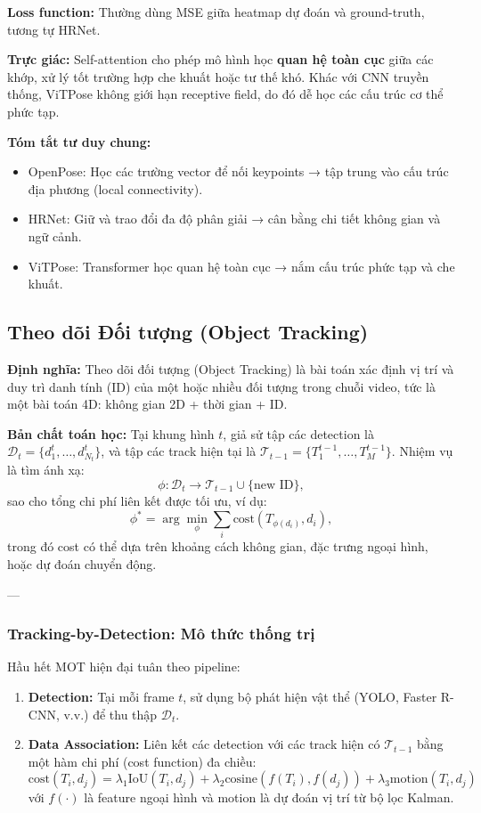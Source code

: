 \textbf{Loss function:} Thường dùng MSE giữa heatmap dự đoán và ground-truth, tương tự HRNet.

\textbf{Trực giác:} Self-attention cho phép mô hình học \textbf{quan hệ toàn cục} giữa các khớp, xử lý tốt trường hợp che khuất hoặc tư thế khó. Khác với CNN truyền thống, ViTPose không giới hạn receptive field, do đó dễ học các cấu trúc cơ thể phức tạp.

\textbf{Tóm tắt tư duy chung:}
\begin{itemize}
	\item OpenPose: Học các trường vector để nối keypoints → tập trung vào cấu trúc địa phương (local connectivity).
	\item HRNet: Giữ và trao đổi đa độ phân giải → cân bằng chi tiết không gian và ngữ cảnh.
	\item ViTPose: Transformer học quan hệ toàn cục → nắm cấu trúc phức tạp và che khuất.
\end{itemize}

\subsection{Theo dõi Đối tượng (Object Tracking)}
\label{subsec:object_tracking}

\textbf{Định nghĩa:} Theo dõi đối tượng (Object Tracking) là bài toán xác định vị trí và duy trì danh tính (ID) của một hoặc nhiều đối tượng trong chuỗi video, tức là một bài toán 4D: không gian 2D + thời gian + ID.  

\textbf{Bản chất toán học:}  
Tại khung hình $t$, giả sử tập các detection là $\mathcal{D}_t = \{d_1^t, \dots, d_{N_t}^t\}$, và tập các track hiện tại là $\mathcal{T}_{t-1} = \{T_1^{t-1}, \dots, T_M^{t-1}\}$. Nhiệm vụ là tìm ánh xạ:
\[
\phi: \mathcal{D}_t \rightarrow \mathcal{T}_{t-1} \cup \{\text{new ID}\},
\]
sao cho tổng chi phí liên kết được tối ưu, ví dụ:
\[
\phi^* = \arg \min_\phi \sum_{i} \text{cost}(T_{\phi(d_i)}, d_i),
\]
trong đó cost có thể dựa trên khoảng cách không gian, đặc trưng ngoại hình, hoặc dự đoán chuyển động.

---

\subsubsection{Tracking-by-Detection: Mô thức thống trị}
\label{subsubsec:tracking_by_detection}

Hầu hết MOT hiện đại tuân theo pipeline:
\begin{enumerate}
	\item \textbf{Detection:} Tại mỗi frame $t$, sử dụng bộ phát hiện vật thể (YOLO, Faster R-CNN, v.v.) để thu thập $\mathcal{D}_t$.
	\item \textbf{Data Association:} Liên kết các detection với các track hiện có $\mathcal{T}_{t-1}$ bằng một hàm chi phí (cost function) đa chiều:
	\[
	\text{cost}(T_i, d_j) = \lambda_1 \text{IoU}(T_i, d_j) + \lambda_2 \text{cosine}(f(T_i), f(d_j)) + \lambda_3 \text{motion}(T_i, d_j)
	\]
	với $f(\cdot)$ là feature ngoại hình và motion là dự đoán vị trí từ bộ lọc Kalman.
\end{enumerate}

